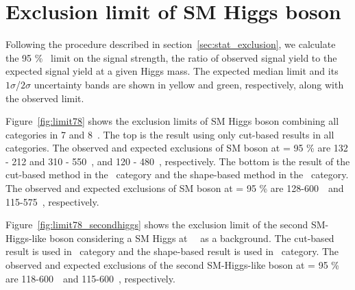 \section{Exclusion limit of SM Higgs boson}  

Following the procedure described in section~\ref{sec:stat_exclusion}, 
we calculate the 95 \% \CLs\ limit on the signal strength, 
the ratio of observed signal yield to the expected signal yield 
at a given Higgs mass. The expected median limit and its $1\sigma$/$2\sigma$ uncertainty
bands are shown in yellow and green, respectively, along with the observed limit. 

Figure~\ref{fig:limit78} shows the exclusion limits of SM Higgs boson combining 
all categories in 7 and 8~\TeV. 
The top is the result using only cut-based results in all categories. 
The observed and expected exclusions of SM boson at \CLs = 95 \% are 
132 - 212 and 310 - 550~\GeV, and 120 - 480~\GeV, respectively. 
The bottom is the result of the cut-based method in the \SF\ category 
and the shape-based method in the \DF\ category.
The observed and expected exclusions of SM boson at \CLs = 95 \% are 
128-600~\GeV\ and 115-575~\GeV, respectively. 

Figure~\ref{fig:limit78_secondhiggs} shows the exclusion limit of 
the second SM-Higgs-like boson considering a SM Higgs at ~\GeV\ as a background.
The cut-based result is used in \SF\ category 
and the shape-based result is used in \DF\ category.
The observed and expected exclusions of the second SM-Higgs-like boson at \CLs = 95 \% 
are 118-600~\GeV\ and 115-600~\GeV, respectively. 

